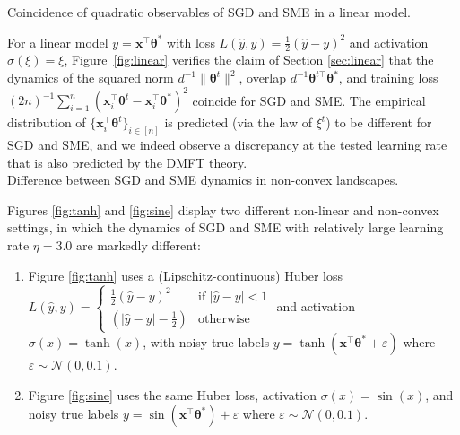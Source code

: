 \documentclass[11pt,letterpaper,reqno]{amsart}
\makeatletter
\def\paragraph{\@startsection{paragraph}{4}%
  \z@\z@{-\fontdimen2\font}%
  {\normalfont\bfseries}}
\theoremstyle{definition}
\def\eps{\varepsilon}
\def\x{\mathbf{x}}
\def\btheta{\boldsymbol{\theta}}
\makeatother
\begin{document}
\paragraph{Coincidence of quadratic observables of SGD and SME in a linear model.}

For a linear model $y=\x^\top \btheta^*$ with loss $L(\hat
y,y)=\frac{1}{2}(\hat y-y)^2$ and activation $\sigma(\xi)=\xi$,
Figure~\ref{fig:linear} verifies the claim of Section \ref{sec:linear}
that the dynamics of the squared norm
$d^{-1}\|\btheta^t\|^2$, overlap $d^{-1}\btheta^{t\top}\btheta^*$,
and training loss $(2n)^{-1}\sum_{i=1}^n (\x_i^\top \btheta^t-\x_i^\top
\btheta^*)^2$ coincide for SGD and SME. The empirical distribution of $\{\x_i^\top
\btheta^t\}_{i \in [n]}$ is predicted (via the law of $\xi^t$) to be different
for SGD and SME, and we indeed observe a discrepancy at the tested
learning rate that is also predicted by the DMFT theory.\\


\paragraph{Difference between SGD and SME dynamics in non-convex landscapes.}

Figures \ref{fig:tanh} and \ref{fig:sine} display two different non-linear
and non-convex settings, in which the dynamics of SGD and SME
with relatively large learning rate $\eta=3.0$ are markedly different:

\begin{enumerate}
    \item Figure \ref{fig:tanh} uses a (Lipschitz-continuous) Huber loss
$L(\hat y,y)=\begin{cases} \frac{1}{2}(\hat y - y)^2 & \text{if } |\hat y - y| < 1 \\ (|\hat y - y| - \frac{1}{2}) & \text{otherwise} \end{cases}$ and activation $\sigma(x)=\tanh(x)$, with noisy true labels $y=\tanh(\x^\top \btheta^*+\eps)$ where $\eps\sim\mathcal{N}(0,0.1)$.
\item Figure \ref{fig:sine} uses the same Huber loss, activation
$\sigma(x)=\sin(x)$, and noisy true labels $y=\sin(\x^\top \btheta^*)+\eps$ where $\eps \sim\mathcal{N}(0,0.1)$.
\end{enumerate}
\end{document}
